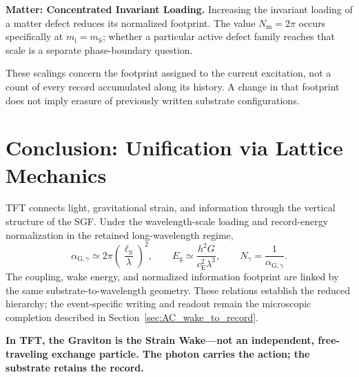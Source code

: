 \medskip
\noindent\textbf{Matter: Concentrated Invariant Loading.}
Increasing the invariant loading of a matter defect reduces its normalized footprint. The value $N_{\mathrm m}=2\pi$ occurs specifically at $m_{\mathrm i}=m_{\mathrm S}$; whether a particular active defect family reaches that scale is a separate phase-boundary question.

These scalings concern the footprint assigned to the current excitation, not a count of every record accumulated along its history. A change in that footprint does not imply erasure of previously written substrate configurations.

\section{Conclusion: Unification via Lattice Mechanics}
\label{sec:AC_conclusion}

TFT connects light, gravitational strain, and information through the vertical structure of the SGF. Under the wavelength-scale loading and record-energy normalization in the retained long-wavelength regime,
\[
    \alpha_{\mathrm G,\gamma}
    \simeq2\pi\left(\frac{\ell_{\mathrm S}}{\lambda}\right)^{2},
    \qquad
    E_{\mathrm g}
    \simeq\frac{h^{2}G}{c_{\mathrm E}^{2}\lambda^{3}},
    \qquad
    N_\gamma=\frac{1}{\alpha_{\mathrm G,\gamma}}.
\]
The coupling, wake energy, and normalized information footprint are linked by the same substrate-to-wavelength geometry. These relations establish the reduced hierarchy; the event-specific writing and readout remain the microscopic completion described in Section~\ref{sec:AC_wake_to_record}.

\noindent\textbf{In TFT, the Graviton is the Strain Wake---not an independent, free-traveling exchange particle. The photon carries the action; the substrate retains the record.}
